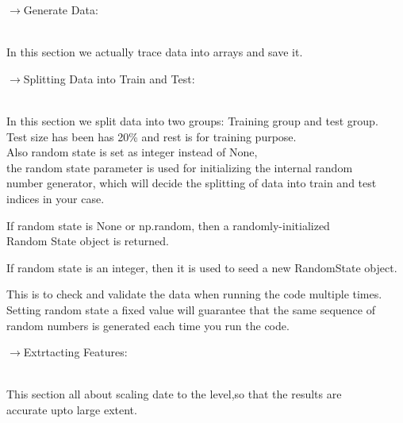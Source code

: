 \documentclass[a4paper,12pt]{article}
\begin{document}
\begin{large}
$\rightarrow$Generate Data:
\end{large}\\

In this section we actually trace data into arrays and save it.\\

\begin{large}
$\rightarrow$Splitting Data into Train and Test:
\end{large}\\

In this section we split data into two groups: Training group and test
\hspace*{0.5cm} group.\\

Test size has been has 20\%  and rest is for training purpose.\\

Also random state is set as integer instead of None,\\
\hspace*{0.5cm} the random state parameter is used for initializing the internal random\\
 \hspace*{0.5cm}  number generator, which will decide the splitting of data into train and \hspace*{0.5cm} test indices in your case.

If random state is None or np.random, then a randomly-initialized \\
\hspace*{0.5cm} Random State object is returned.

If random state is an integer, then it is used to seed a new RandomState  
\hspace*{0.5cm}  object.

This is to check and validate the data when running the code multiple
\hspace*{0.5cm} times. Setting random state a fixed value will guarantee that the same 
\hspace*{0.5cm} sequence of random numbers is generated each time you run the code.\\

\begin{large}
$\rightarrow$Extrtacting Features:
\end{large}\\

This section all about scaling date to the level,so that the results are\\  
 \hspace*{0.5cm}  accurate upto large extent.\\
 
\end{document}
